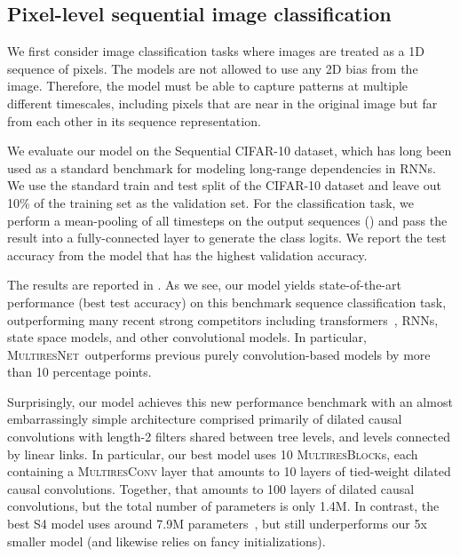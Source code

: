 \documentclass{article}
\theoremstyle{plain}
\theoremstyle{definition}
\theoremstyle{remark}
\newcommand{\ourmodel}{\textsc{MultiresNet}}
\begin{document}
\subsection{Pixel-level sequential image classification}
\label{sec:exp-sCIFAR}

We first consider image classification tasks where images are treated as a 1D sequence of pixels. 
The models are not allowed to use any 2D bias from the  image. 
Therefore, the model must be able to capture patterns at multiple different timescales, including pixels that are near in the original image but far from each other in its sequence representation. 

We evaluate our model on the Sequential CIFAR-10 dataset, which has long been used as a standard benchmark for modeling long-range dependencies in RNNs. 
We use the standard train and test split of the CIFAR-10 dataset and leave out 10\% of the training set as the validation set. 
For the classification task, we perform a mean-pooling of all timesteps on the output sequences () and pass the result into a fully-connected layer to generate the class logits. 
We report the test accuracy from the model that has the highest validation accuracy. 

The results are reported in . 
As we see, our model yields state-of-the-art performance (best test accuracy) on this benchmark sequence classification task, outperforming many recent strong competitors including transformers~\citep{vaswani2017attention}, RNNs, state space models, and other convolutional models. 
In particular, \ourmodel\ outperforms previous purely convolution-based models by more than 10 percentage points. 

Surprisingly, our model achieves this new performance benchmark with an almost embarrassingly simple architecture comprised primarily of dilated causal convolutions with length-2 filters shared between tree levels, and levels connected by linear links. In particular, our best model uses 10 \textsc{MultiresBlock}s, each containing a \textsc{MultiresConv} layer that amounts to 10 layers of tied-weight dilated causal convolutions. 
Together, that amounts to 100 layers of dilated causal convolutions, but the total number of parameters is only 1.4M. 
In contrast, the best S4 model uses around 7.9M parameters~\citep{gu2021efficiently}, but still underperforms our 5x smaller model (and likewise relies on fancy initializations). 
\end{document}
